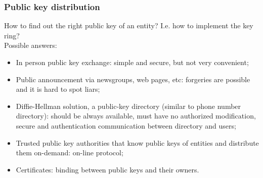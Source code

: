\documentclass[a4paper, 10pt, titlepage]{article}
\begin{document}
\subsubsection{Public key distribution}
How to find out the right public key of an entity? I.e. how to implement the key ring?\\
Possible answers:
\begin{itemize}
\item In person public key exchange: simple and secure, but not very convenient;
\item Public announcement via newsgroups, web pages, etc: forgeries are possible and it is hard to spot liars;
\item Diffie-Hellman solution, a public-key directory (similar to phone number directory): should be always available, must have no authorized modification, secure and authentication communication between directory and users;
\item Trusted public key authorities that know public keys of entities and distribute them on-demand: on-line protocol;
\item Certificates: binding between public keys and their owners.
\end{itemize}
\end{document}
